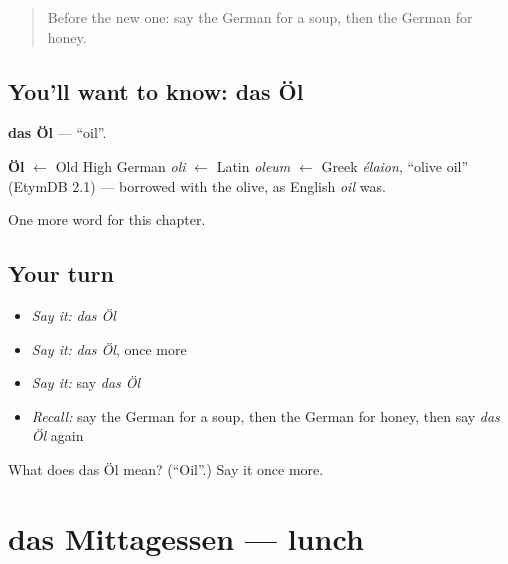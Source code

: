 \label{lesson:GE-C71-oel}



\begin{quote}
Before the new one: say the German for a soup, then the German for honey.
\end{quote}

\subsection*{You'll want to know: das Öl}
\textbf{das Öl} — \textquotedblleft{}oil\textquotedblright{}.

\begin{cousinweb}
\textbf{Öl} $\leftarrow$ Old High German \emph{oli} $\leftarrow$ Latin \emph{oleum} $\leftarrow$ Greek \emph{élaion}, \textquotedblleft{}olive oil\textquotedblright{} (EtymDB 2.1) — borrowed with the olive, as English \emph{oil} was.
\end{cousinweb}

\begin{grammarlens}[title={What you've built}]
One more word for this chapter.
\end{grammarlens}

\subsection*{Your turn}
\begin{itemize}
\raggedright
  \item \emph{Say it:} \emph{das Öl}
  \item \emph{Say it:} \emph{das Öl}, once more
  \item \emph{Say it:} say \emph{das Öl}
  \item \emph{Recall:} say the German for a soup, then the German for honey, then say \emph{das Öl} again
\end{itemize}

\begin{tcolorbox}[breakable,colback=teal!4,colframe=teal!35!black,title={Before you move on}]
What does das Öl mean? (\textquotedblleft{}Oil\textquotedblright{}.) Say it once more.
\end{tcolorbox}
\section[das Mittagessen]{das Mittagessen — lunch}

\label{lesson:GE-C71-mittagessen}



